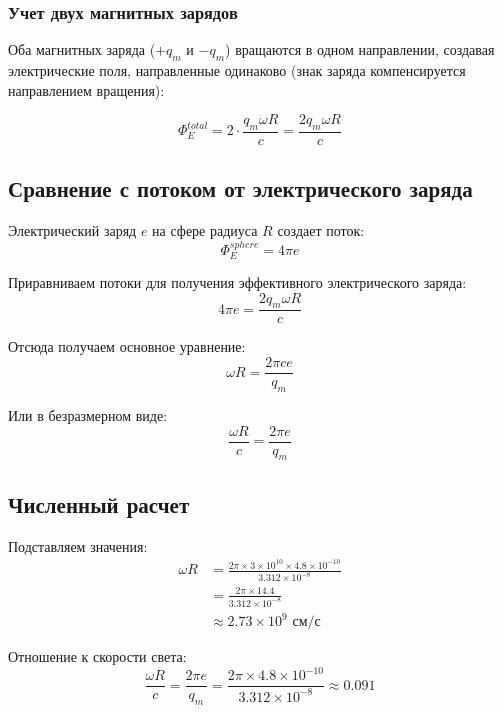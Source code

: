 \documentclass[12pt,a4paper]{article}
\begin{document}
\subsubsection{Учет двух магнитных зарядов}

Оба магнитных заряда ($+q_m$ и $-q_m$) вращаются в одном направлении, создавая электрические поля, направленные одинаково (знак заряда компенсируется направлением вращения):

\begin{equation}
\Phi_E^{total} = 2 \cdot \frac{q_m \omega R}{c} = \frac{2q_m \omega R}{c}
\label{eq:total_flux}
\end{equation}

\subsection{Сравнение с потоком от электрического заряда}

Электрический заряд $e$ на сфере радиуса $R$ создает поток:
\begin{equation}
\Phi_E^{sphere} = 4\pi e
\end{equation}

Приравниваем потоки для получения эффективного электрического заряда:
\begin{equation}
4\pi e = \frac{2q_m \omega R}{c}
\end{equation}

Отсюда получаем основное уравнение:
\begin{equation}
\boxed{\omega R = \frac{2\pi c e}{q_m}}
\label{eq:main}
\end{equation}

Или в безразмерном виде:
\begin{equation}
\frac{\omega R}{c} = \frac{2\pi e}{q_m}
\end{equation}

\subsection{Численный расчет}

Подставляем значения:
\begin{align}
\omega R &= \frac{2\pi \times 3 \times 10^{10} \times 4.8 \times 10^{-10}}{3.312 \times 10^{-8}} \\
&= \frac{2\pi \times 14.4}{3.312 \times 10^{-8}} \\
&\approx 2.73 \times 10^9 \text{ см/с}
\end{align}

Отношение к скорости света:
\begin{equation}
\boxed{\frac{\omega R}{c} = \frac{2\pi e}{q_m} = \frac{2\pi \times 4.8 \times 10^{-10}}{3.312 \times 10^{-8}} \approx 0.091}
\end{equation}
\end{document}
